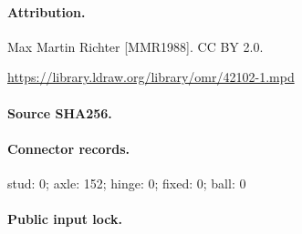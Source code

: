 \paragraph{Attribution.}Max Martin Richter [MMR1988]. CC BY 2.0.\par\url{https://library.ldraw.org/library/omr/42102-1.mpd}
\paragraph{Source SHA256.}
\paragraph{Connector records.}stud: 0; axle: 152; hinge: 0; fixed: 0; ball: 0
\paragraph{Public input lock.}
